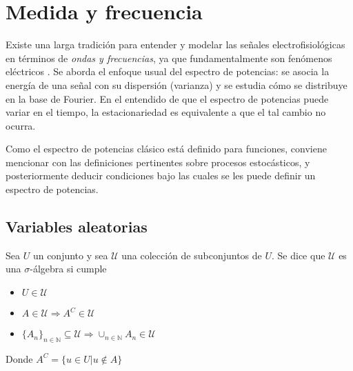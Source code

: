 
\chapter{Medida y frecuencia}

Existe una larga tradición para entender y modelar las señales electrofisiológicas en términos de 
\textit{ondas y frecuencias}, ya que fundamentalmente son fenómenos eléctricos \cite{Kaiser00}.
%
Se aborda el enfoque usual del espectro de potencias: se asocia la energía de una señal con su 
dispersión (varianza) y se estudia cómo se distribuye en la base de Fourier.
%
En el entendido de que el espectro de potencias puede variar en el tiempo, la estacionariedad
es equivalente a que el tal cambio no ocurra.

Como el espectro de potencias clásico está definido para funciones, conviene mencionar con las 
definiciones pertinentes sobre procesos estocásticos, y posteriormente deducir condiciones bajo las 
cuales se les puede definir un espectro de potencias.


\section{Variables aleatorias}

\begin{definicion}
Sea $U$ un conjunto y sea $\mathcal{U}$ una colección de subconjuntos de $U$. Se dice que 
$\mathcal{U}$ es una $\sigma$-álgebra si cumple
\begin{itemize}
\item $U \in \mathcal{U}$
\item $A \in \mathcal{U} \Rightarrow A^{C} \in \mathcal{U}$
\item 
$ \displaystyle \{ A_n \}_{n\in \mathbb{N}} \subseteq \mathcal{U} 
\Rightarrow \cup_{n\in \mathbb{N}} A_n \in \mathcal{U}$
\end{itemize}
Donde $A^{C} = \{ u \in U | u \notin A \} $
\end{definicion}

